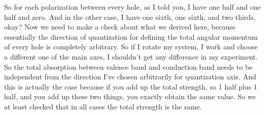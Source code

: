 So for each polarization between every hole, as I told you, I have one half and one half and zero. And in the other case, I have one sixth, one sixth, and two thirds, okay? Now we need to make a check about what we derived here, because essentially the direction of quantization for defining the total angular momentum of every hole is completely arbitrary. So if I rotate my system, I work and choose a different one of the main axes, I shouldn't get any difference in my experiment. So the total absorption between valence band and conduction band needs to be independent from the direction I've chosen arbitrarily for quantization axis. And this is actually the case because if you add up the total strength, so 1 half plus 1 half, and you add up these two things, you exactly obtain the same value. So we at least checked that in all cases the total strength is the same.